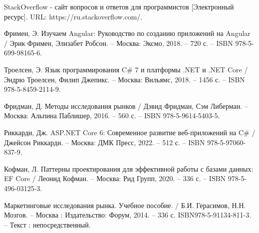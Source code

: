 \begin{thebibliography}{14}
     StackOverflow -\- сайт вопросов и ответов для программистов [Электронный ресурс]. URL: https://ru.stackoverflow.com/.

     Фримен, Э. Изучаем Angular: Руководство по созданию приложений на Angular / Эрик Фримен, Элизабет Робсон. – Москва: Эксмо, 2018. – 720 с. – ISBN 978-5-699-98165-6.

     Троелсен, Э. Язык программирования C\# 7 и платформы .NET и .NET Core / Эндрю Троелсен, Филип Джепикс. – Москва: Вильямс, 2018. – 1456 с. – ISBN 978-5-8459-2114-9.

     Фридман, Д. Методы исследования рынков / Дэвид Фридман, Сэм Либерман. – Москва: Альпина Паблишер, 2016. – 560 с. – ISBN 978-5-9614-5403-5.

     Риккарди, Дж. ASP.NET Core 6: Современное развитие веб-приложений на C\# / Джейсон Риккарди. – Москва: ДМК Пресс, 2022. – 512 с. – ISBN 978-5-97060-837-9.

     Кофман, Л. Паттерны проектирования для эффективной работы с базами данных: EF Core / Леонид Кофман. – Москва: Рид Групп, 2020. – 336 с. – ISBN 978-5-496-03125-3.

     Маркетинговые исследования рынка. Учебное пособие. / Б.И. Герасимов, Н.Н. Мозгов. – Москва : Издательство: Форум, 2014. – 336 с. ISBN978-5-91134-811-3. – Текст : непосредственный.
\end{thebibliography}
